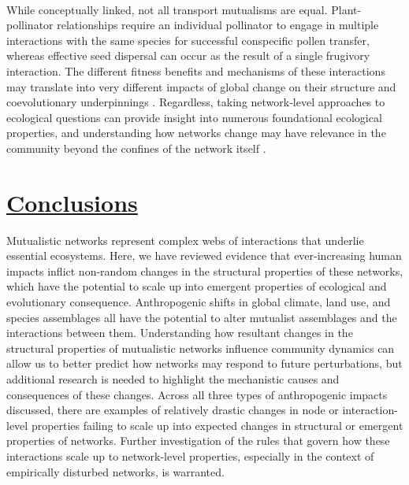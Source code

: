 \paragraph*{}
While conceptually linked, not all transport mutualisms are equal. Plant-pollinator relationships require an individual pollinator to engage in multiple interactions with the same species for successful conspecific pollen transfer, whereas effective seed dispersal can occur as the result of a single frugivory interaction. The different fitness benefits and mechanisms of these interactions may translate into very different impacts of global change on their structure and coevolutionary underpinnings \parencite{wheelwright1982seed}. Regardless, taking network-level approaches to ecological questions can provide insight into numerous foundational ecological properties, and understanding how networks change may have relevance in the community beyond the confines of the network itself \parencite{windsor2022using}.

\section*{\textbf{\underline{Conclusions}}}

Mutualistic networks represent complex webs of interactions that underlie essential ecosystems. Here, we have reviewed evidence that ever-increasing human impacts inflict non-random changes in the structural properties of these networks, which have the potential to scale up into emergent properties of ecological and evolutionary consequence. Anthropogenic shifts in global climate, land use, and species assemblages all have the potential to alter mutualist assemblages and the interactions between them. Understanding how resultant changes in the structural properties of mutualistic networks influence community dynamics can allow us to better predict how networks may respond to future perturbations, but additional research is needed to highlight the mechanistic causes and consequences of these changes. Across all three types of anthropogenic impacts discussed, there are examples of relatively drastic changes in node or interaction-level properties failing to scale up into expected changes in structural or emergent properties of networks. Further investigation of the rules that govern how these interactions scale up to network-level properties, especially in the context of empirically disturbed networks, is warranted. 

